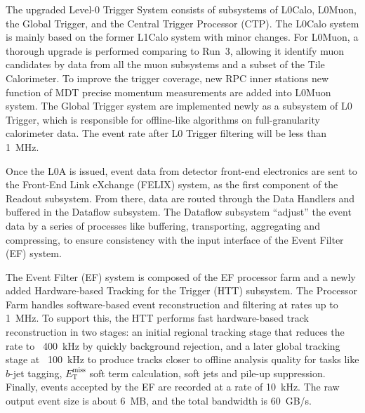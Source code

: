 The upgraded Level-0 Trigger System consists of subsystems of L0Calo, L0Muon, the Global Trigger, and the Central Trigger Processor (CTP). The L0Calo system is mainly based on the former L1Calo system with minor changes. For L0Muon, a thorough upgrade is performed comparing to Run~3, allowing it identify muon candidates by data from all the muon subsystems and a subset of the Tile Calorimeter. To improve the trigger coverage, new RPC inner stations new function of MDT precise momentum measurements are added into L0Muon system. The Global Trigger system are implemented newly as a subsystem of L0 Trigger, which is responsible for offline-like algorithms on full-granularity calorimeter data. The event rate after L0 Trigger filtering will be less than 1~MHz.

Once the L0A is issued, event data from detector front-end electronics are sent to the Front-End Link eXchange (FELIX) system, as the first component of the Readout subsystem. From there, data are routed through the Data Handlers and buffered in the Dataflow subsystem. The Dataflow subsystem ``adjust'' the event data by a series of processes like buffering, transporting, aggregating and compressing, to ensure consistency with the input interface of the Event Filter (EF) system.

The Event Filter (EF) system is composed of the EF processor farm and a newly added Hardware-based Tracking for the Trigger (HTT) subsystem. The Processor Farm handles software-based event reconstruction and filtering at rates up to 1~MHz. To support this, the HTT performs fast hardware-based track reconstruction in two stages: an initial regional tracking stage that reduces the rate to ~400~kHz by quickly background rejection, and a later global tracking stage at ~100~kHz to produce tracks closer to offline analysis quality for tasks like $b$-jet tagging, ${E}_\mathrm{T}^\mathrm{miss}$ soft term calculation, soft jets and pile-up suppression. Finally, events accepted by the EF are recorded at a rate of 10~kHz. The raw output event size is about 6~MB, and the total bandwidth is 60~GB/s.

